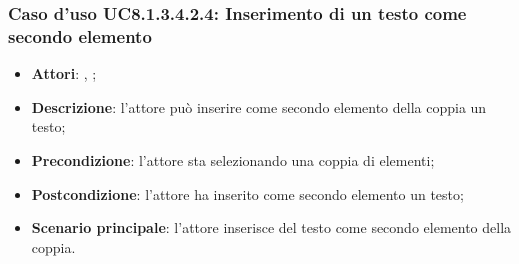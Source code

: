 		\subsubsection{Caso d'uso UC8.1.3.4.2.4: Inserimento di un testo come secondo elemento}
		\label{UC8.1.3.4.2.4}
		\begin{itemize}
			\item \textbf{Attori}: \uau, \uaupro;
			\item \textbf{Descrizione}: l'attore può inserire come secondo elemento della coppia un testo;
			\item \textbf{Precondizione}: l'attore sta selezionando una coppia di elementi;
			\item \textbf{Postcondizione}: l'attore ha inserito come secondo elemento un testo;
			\item \textbf{Scenario principale}: l'attore inserisce del testo come secondo elemento della coppia.
		\end{itemize}
	
